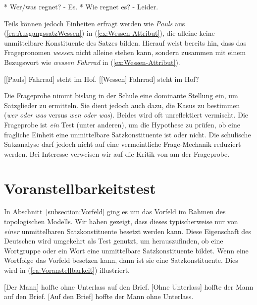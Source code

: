 \ea \label{ea:Nichterfragbar}
\ea \label{ea:wer regnet} * Wer/was regnet? - Es.
\ex \label{ex:Kommentarglied?} * Wie regnet es? - Leider. 
\z 
\z 


Teils können jedoch Einheiten erfragt werden wie \textit{Pauls} aus (\ref{ea:AusgangssatzWessen}) in (\ref{ex:Wessen-Attribut}), die alleine keine unmittelbare Konstituente des Satzes bilden. Hierauf weist bereits hin, dass das Fragepronomen \textit{wessen} nicht alleine stehen kann, sondern zusammen mit einem Bezugswort wie \textit{wessen Fahrrad} in (\ref{ex:Wessen-Attribut}).   

\ea \label{ea:Wessen-Frage}
\ea \label{ea:AusgangssatzWessen} [[Pauls] Fahrrad] steht im Hof.
\ex \label{ex:Wessen-Attribut} [[Wessen] Fahrrad] steht im Hof?
\z 
\z 


Die Frageprobe nimmt bislang in der Schule eine dominante Stellung ein, um Satzglieder zu ermitteln. Sie dient jedoch auch dazu, die Kasus zu bestimmen (\textit{wer oder was} versus \textit{wen oder was}). Beides wird oft unreflektiert vermischt. Die Frageprobe ist \textit{ein} Test (unter anderen), um die Hypothese zu prüfen, ob eine fragliche Einheit eine unmittelbare Satzkonstituente ist oder nicht. Die schulische Satzanalyse darf jedoch nicht auf eine vermeintliche Frage-Mechanik reduziert werden. Bei Interesse verweisen wir auf die Kritik von \citet[87]{Granzow-Emden2006} am  der Frageprobe. 


\section{Voranstellbarkeitstest}\label{section:Voranstellungstest}

In Abschnitt~\ref{subsection:Vorfeld} ging es um das Vorfeld im Rahmen des topologischen Modells. Wir haben gezeigt, dass dieses typischerweise nur von \textit{einer} unmittelbaren Satzkonstituente besetzt werden kann. Diese Eigenschaft des Deutschen wird umgekehrt als Test genutzt, um herauszufinden, ob eine Wortgruppe oder ein Wort eine unmittelbare Satzkonstituente bildet. Wenn eine Wortfolge das Vorfeld besetzen kann, dann ist sie eine Satzkonstituente.  Dies wird in (\ref{ea:Voranstellbarkeit}) illustriert.

\ea \label{ea:Voranstellbarkeit}
\ea \label{ea:derkleineMannVF} [Der Mann] hoffte ohne Unterlass auf den Brief.
\ex \label{ex:langeimVF} [Ohne Unterlass] hoffte der Mann auf den Brief.
\ex \label{aufdenBriefimVF} [Auf den Brief] hoffte der Mann ohne Unterlass.
\z 
\z 

